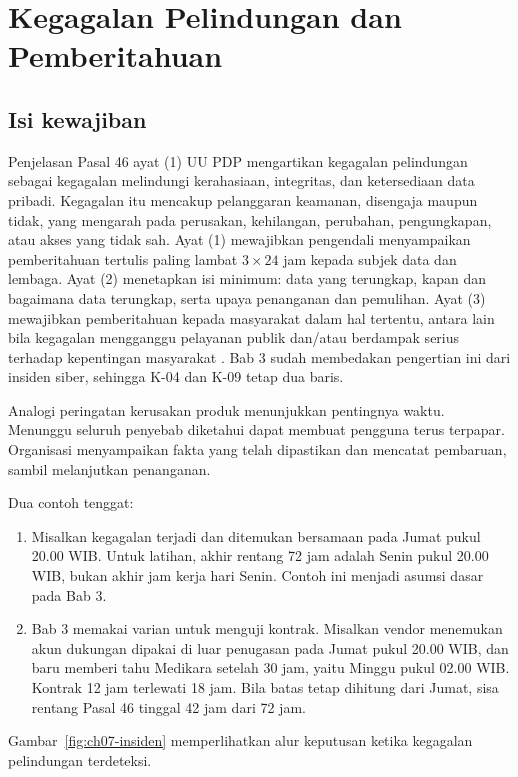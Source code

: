 \section{Kegagalan Pelindungan dan Pemberitahuan}

\subsection*{Isi kewajiban}

Penjelasan Pasal 46 ayat (1) UU PDP mengartikan kegagalan pelindungan sebagai kegagalan melindungi
kerahasiaan, integritas, dan ketersediaan data pribadi. Kegagalan itu mencakup pelanggaran keamanan,
disengaja maupun tidak, yang mengarah pada perusakan, kehilangan, perubahan, pengungkapan, atau
akses yang tidak sah. Ayat (1) mewajibkan pengendali menyampaikan pemberitahuan tertulis paling
lambat $3 \times 24$ jam kepada subjek data dan lembaga. Ayat (2) menetapkan isi minimum: data yang
terungkap, kapan dan bagaimana data terungkap, serta upaya penanganan dan pemulihan. Ayat (3)
mewajibkan pemberitahuan kepada masyarakat dalam hal tertentu, antara lain bila kegagalan mengganggu
pelayanan publik dan/atau berdampak serius terhadap kepentingan masyarakat \cite{uu27-2022-pdp}. Bab
3 sudah membedakan pengertian ini dari insiden siber, sehingga K-04 dan K-09 tetap dua baris.

Analogi peringatan kerusakan produk menunjukkan pentingnya waktu. Menunggu seluruh penyebab
diketahui dapat membuat pengguna terus terpapar. Organisasi menyampaikan fakta yang telah dipastikan
dan mencatat pembaruan, sambil melanjutkan penanganan.

Dua contoh tenggat:
\begin{enumerate}
  \item Misalkan kegagalan terjadi dan ditemukan bersamaan pada Jumat pukul 20.00 WIB. Untuk
  latihan, akhir rentang 72 jam adalah Senin pukul 20.00 WIB, bukan akhir jam kerja hari Senin.
  Contoh ini menjadi asumsi dasar pada Bab 3.
  \item Bab 3 memakai varian untuk menguji kontrak. Misalkan vendor menemukan akun dukungan dipakai
  di luar penugasan pada Jumat pukul 20.00 WIB, dan baru memberi tahu Medikara setelah 30 jam, yaitu
  Minggu pukul 02.00 WIB. Kontrak 12 jam terlewati 18 jam. Bila batas tetap dihitung dari Jumat,
  sisa rentang Pasal 46 tinggal 42 jam dari 72 jam.
\end{enumerate}

Gambar~\ref{fig:ch07-insiden} memperlihatkan alur keputusan ketika kegagalan pelindungan terdeteksi.

